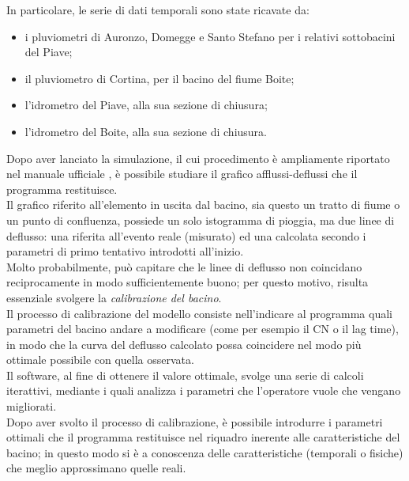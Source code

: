 In particolare, le serie di dati temporali sono state ricavate da:
\begin{itemize}
    \item i pluviometri di Auronzo, Domegge e Santo Stefano per i relativi sottobacini del Piave;
    \item il pluviometro di Cortina, per il bacino del fiume Boite;
    \item l'idrometro del Piave, alla sua sezione di chiusura;
    \item l'idrometro del Boite, alla sua sezione di chiusura.
\end{itemize}
Dopo aver lanciato la simulazione, il cui procedimento è ampliamente riportato nel manuale ufficiale \cite{manual_hec_hms}, è possibile studiare il grafico afflussi-deflussi che il programma restituisce.\\
Il grafico riferito all'elemento in uscita dal bacino, sia questo un tratto di fiume o un punto di confluenza, possiede un solo istogramma di pioggia, ma due linee di deflusso: una riferita all'evento reale (misurato) ed una calcolata secondo i parametri di primo tentativo introdotti all'inizio.\\
Molto probabilmente, può capitare che le linee di deflusso non coincidano reciprocamente in modo sufficientemente buono; per questo motivo, risulta essenziale svolgere la \textit{calibrazione del bacino}.\\
Il processo di calibrazione del modello consiste nell'indicare al programma quali parametri del bacino andare a modificare (come per esempio il CN o il lag time), in modo che la curva del deflusso calcolato possa coincidere nel modo più ottimale possibile con quella osservata.\\
Il software, al fine di ottenere il valore ottimale, svolge una serie di calcoli iterattivi, mediante i quali analizza i parametri che l'operatore vuole che vengano migliorati.\\
Dopo aver svolto il processo di calibrazione, è possibile introdurre i parametri ottimali che il programma restituisce nel riquadro inerente alle caratteristiche del bacino; in questo modo si è a conoscenza delle caratteristiche (temporali o fisiche) che meglio approssimano quelle reali.
